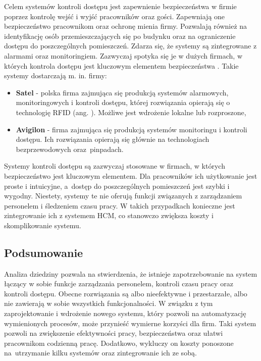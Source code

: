 Celem systemów kontroli dostępu jest zapewnienie bezpieczeństwa w firmie poprzez kontrolę wejść i wyjść pracowników oraz gości. Zapewniają one bezpieczeństwo pracownikom oraz ochronę mienia firmy. Pozwalają również na identyfikację osób przemieszczających się po budynku oraz na ograniczenie dostępu do poszczególnych pomieszczeń. Zdarza się, że systemy są zintegrowane z alarmami oraz monitoringiem. Zazwyczaj spotyka się je w dużych firmach, w których kontrola dostępu jest kluczowym elementem bezpieczeństwa \cite{bib:KontrolaDostepu}. Takie systemy dostarczają m. in. firmy:

\begin{itemize}
    \item \textbf{Satel} \cite{bib:satel} - polska firma zajmująca się produkcją systemów alarmowych, monitoringowych i kontroli dostępu, której rozwiązania opierają się o technologię RFID (ang. ). Możliwe jest wdrożenie lokalne lub rozproszone,
    \item \textbf{Avigilon} \cite{bib:avigilon} - firma zajmująca się produkcją systemów monitoringu i kontroli dostępu. Ich rozwiązania opierają się głównie na technologiach bezprzewodowych oraz~pinpadach.
\end{itemize}

Systemy kontroli dostępu są zazwyczaj stosowane w firmach, w których bezpieczeństwo jest kluczowym elementem. Dla pracowników ich użytkowanie jest proste i intuicyjne, a~dostęp do poszczególnych pomieszczeń jest szybki i wygodny. Niestety, systemy te nie oferują funkcji związanych z zarządzaniem personelem i śledzeniem czasu pracy. W takich przypadkach konieczne jest zintegrowanie ich z systemem HCM, co stanowczo zwiększa koszty i skomplikowanie systemu.

\subsection{Podsumowanie}

Analiza dziedziny pozwala na stwierdzenia, że istnieje zapotrzebowanie na system łączący w sobie funkcje zarządzania personelem, kontroli czasu pracy oraz kontroli dostępu. Obecne rozwiązania są albo nieefektywne i przestarzałe, albo nie zawierają w sobie wszystkich funkcjonalności. W związku z tym zaprojektowanie i wdrożenie nowego systemu, który pozwoli na automatyzację wymienionych procesów, może przynieść wymierne korzyści dla firm. Taki system pozwoli na zwiększenie efektywności pracy, bezpieczeństwa oraz ułatwi pracownikom codzienną pracę. Dodatkowo, wykluczy on koszty ponoszone na~utrzymanie kilku systemów oraz zintegrowanie ich ze sobą.

